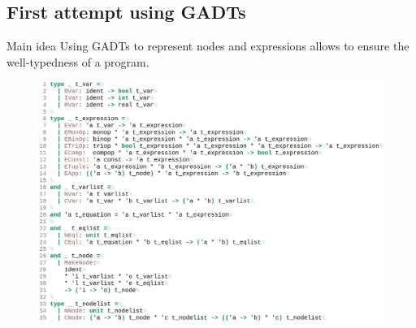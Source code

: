 \documentclass{beamer}
\begin{document}
\subsection{First attempt using GADTs}
\begin{frame}
	\begin{block}{Main idea}
		Using GADTs to represent nodes and expressions allows to ensure the
		well-typedness of a program.
	\end{block}
	\begin{figure}
		\centering
		\includegraphics[width=.75\textwidth]{imgs/gadt.png}
	\end{figure}
%
%
%
%
%
%
\end{frame}
\end{document}
